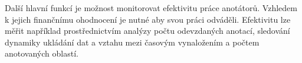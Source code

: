 Další hlavní funkcí je možnost monitorovat efektivitu práce anotátorů. Vzhledem k jejich finančnímu ohodnocení je nutné aby svou práci odváděli. Efektivitu lze měřit například prostřednictvím analýzy počtu odevzdaných anotací, sledování dynamiky ukládání dat a vztahu mezi časovým vynaložením a počtem anotovaných oblastí.


